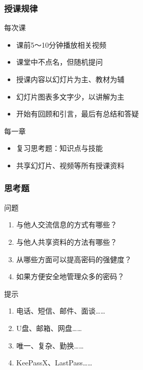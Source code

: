 \begin{frame}
  \frametitle{授课规律}
  \begin{block}{每次课}
    \begin{itemize}
      \item 课前5～10分钟播放相关视频
      \item 课堂中不点名，但随机提问
      \item 授课内容以幻灯片为主、教材为辅
      \item 幻灯片图表多文字少，以讲解为主
      \item 开始有回顾和引言，最后有总结和答疑
    \end{itemize}
  \end{block}
  \pause
  \begin{block}{每一章}
    \begin{itemize}
      \item 复习思考题：知识点与技能
      \item 共享幻灯片、视频等所有授课资料
    \end{itemize}
  \end{block}
\end{frame}

\begin{frame}
  \frametitle{思考题}
  \begin{block}{问题}
  \begin{enumerate}[<+->]
    \item 与他人交流信息的方式有哪些？
    \item 与他人共享资料的方法有哪些？
    \item 从哪些方面可以提高密码的强健度？
    \item 如果方便安全地管理众多的密码？
  \end{enumerate}
  \end{block}
  \pause
  \begin{block}{提示}
    \begin{enumerate}
      \item 电话、短信、邮件、面谈……
      \item U盘、邮箱、网盘……
      \item 唯一、复杂、勤换……
      \item KeePassX、LastPass……
    \end{enumerate}
  \end{block}
\end{frame}




